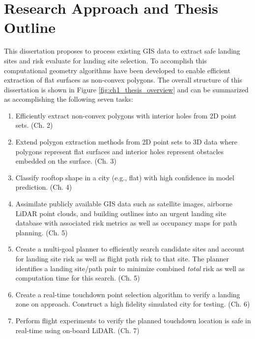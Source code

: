 \section{Research Approach and Thesis Outline}


This dissertation proposes to process existing \ac{GIS} data to extract safe landing sites and risk evaluate for landing site selection. To accomplish this computational geometry algorithms have been developed to enable efficient extraction of flat surfaces as non-convex polygons. The overall structure of this dissertation is shown in Figure \ref{fig:ch1_thesis_overview} and can be summarized as accomplishing the following seven tasks:

\begin{enumerate}[noitemsep]
    \item Efficiently extract non-convex polygons with interior holes from 2D point sets. (Ch. 2)
    \item Extend polygon extraction methods from 2D point sets to 3D data where polygons represent flat surfaces and interior holes represent obstacles embedded on the surface. (Ch. 3)
    \item Classify rooftop shape in a city (e.g., flat) with high confidence in model prediction. (Ch. 4)
    \item Assimilate publicly available GIS data such as satellite images, airborne LiDAR point clouds, and building outlines into an urgent landing site database with associated risk metrics as well as occupancy maps for path planning. (Ch. 5)
    \item Create a multi-goal planner to efficiently search candidate sites and account for landing site risk as well as flight path risk to that site. The planner identifies a landing site/path pair to minimize combined \emph{total} risk as well as computation time for this search. (Ch. 5)
    \item Create a real-time touchdown point selection algorithm to verify a landing zone on approach. Construct a high fidelity simulated city for testing. (Ch. 6)
    \item Perform flight experiments to verify the planned touchdown location is safe in real-time using on-board \ac{LiDAR}. (Ch. 7)
\end{enumerate}

